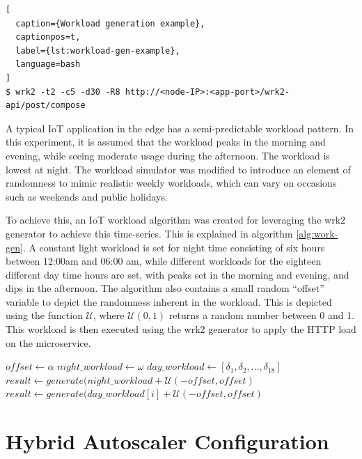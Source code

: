 \begin{lstlisting}[
  caption={Workload generation example},
  captionpos=t,
  label={lst:workload-gen-example},
  language=bash
]
$ wrk2 -t2 -c5 -d30 -R8 http://<node-IP>:<app-port>/wrk2-api/post/compose
\end{lstlisting}



A typical IoT application in the edge has a semi-predictable workload pattern. In this experiment, it is assumed that the workload peaks in the morning and evening, while seeing moderate usage during the afternoon. The workload is lowest at night. The workload simulator was modified to introduce an element of randomness to mimic realistic weekly workloads, which can vary on occasions such as weekends and public holidays.\par

To achieve this, an IoT workload algorithm was created for leveraging the wrk2 generator to achieve this time-series. This is explained in algorithm \ref{alg:work-gen}. A constant light workload is set for night time consisting of six hours between 12:00am and 06:00 am, while different workloads for the eighteen different day time hours are set, with peaks set in the morning and evening, and dips in the afternoon. The algorithm also contains a small random ``offset'' variable to depict the randomness inherent in the workload. This is depicted using the function $\mathcal{U}$, where $\mathcal{U}(0,1)$ returns a random number between 0 and 1. This workload is then executed using the wrk2 generator to apply the HTTP load on the microservice.

\begin{algorithm}
    \caption{IoT workload generation algorithm}
    \label{alg:work-gen}
    \begin{algorithmic}
        \State $offset \gets \alpha$
        \State $night\_workload \gets \omega$
        \State $day\_workload \gets [ \delta_1, \delta_2, ... , \delta_{18}]$
                \State $result \gets generate(night\_workload + \mathcal{U}(-offset,offset)$
            \EndFor
                \State $result \gets generate(day\_workload[i] + \mathcal{U}(-offset,offset)$
            \EndFor
        \EndWhile
    \end{algorithmic}
\end{algorithm}

\section{Hybrid Autoscaler Configuration}
\label{sec:ch4-hybrid-auto-arch}


